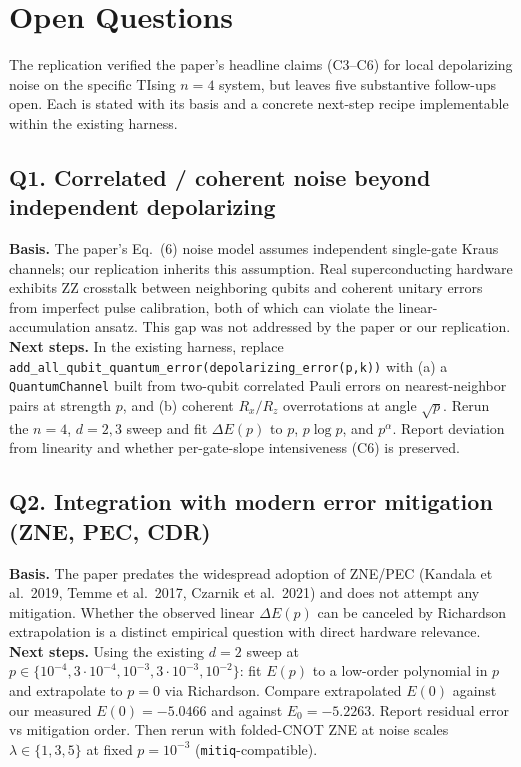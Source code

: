 \section{Open Questions}

The replication verified the paper's headline claims (C3--C6) for local depolarizing noise on the
specific TIsing $n{=}4$ system, but leaves five substantive follow-ups open. Each is stated with
its basis and a concrete next-step recipe implementable within the existing harness.

\subsection*{Q1. Correlated / coherent noise beyond independent depolarizing}
\textbf{Basis.} The paper's Eq.~(6) noise model assumes independent single-gate Kraus channels; our
replication inherits this assumption. Real superconducting hardware exhibits ZZ crosstalk between
neighboring qubits and coherent unitary errors from imperfect pulse calibration, both of which can
violate the linear-accumulation ansatz. This gap was not addressed by the paper or our replication.
\\
\textbf{Next steps.} In the existing harness, replace
\texttt{add\_all\_qubit\_quantum\_error(depolarizing\_error(p,k))} with
(a) a \texttt{QuantumChannel} built from two-qubit correlated Pauli errors on nearest-neighbor pairs
at strength $p$, and
(b) coherent $R_x/R_z$ overrotations at angle $\sqrt{p}$.
Rerun the $n{=}4$, $d{=}2,3$ sweep and fit $\Delta E(p)$ to $p$, $p\log p$, and $p^\alpha$. Report
deviation from linearity and whether per-gate-slope intensiveness (C6) is preserved.

\subsection*{Q2. Integration with modern error mitigation (ZNE, PEC, CDR)}
\textbf{Basis.} The paper predates the widespread adoption of ZNE/PEC (Kandala et al.\ 2019, Temme
et al.\ 2017, Czarnik et al.\ 2021) and does not attempt any mitigation. Whether the observed linear
$\Delta E(p)$ can be canceled by Richardson extrapolation is a distinct empirical question with direct
hardware relevance.
\\
\textbf{Next steps.} Using the existing $d{=}2$ sweep at $p \in \{10^{-4}, 3\!\cdot\!10^{-4},
10^{-3}, 3\!\cdot\!10^{-3}, 10^{-2}\}$: fit $E(p)$ to a low-order polynomial in $p$ and extrapolate
to $p{=}0$ via Richardson. Compare extrapolated $E(0)$ against our measured $E(0){=}-5.0466$ and
against $E_0{=}-5.2263$. Report residual error vs mitigation order. Then rerun with folded-CNOT ZNE
at noise scales $\lambda \in \{1, 3, 5\}$ at fixed $p{=}10^{-3}$ (\texttt{mitiq}-compatible).

